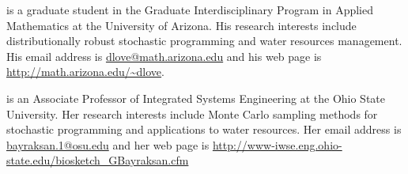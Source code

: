 \documentclass[11pt]{article}
\begin{document}
 is a graduate student in the Graduate Interdisciplinary Program in Applied Mathematics at the University of Arizona.
His research interests include distributionally robust stochastic programming and water resources management.
His email address is \url{dlove@math.arizona.edu} and his web page is \url{http://math.arizona.edu/~dlove}.

\bigskip

 is an Associate Professor of Integrated Systems Engineering at the Ohio State University.
Her research interests include Monte Carlo sampling methods for stochastic programming and applications to water resources.
Her email address is \url{bayraksan.1@osu.edu} and her web page is \url{http://www-iwse.eng.ohio-state.edu/biosketch_GBayraksan.cfm}
\end{document}
